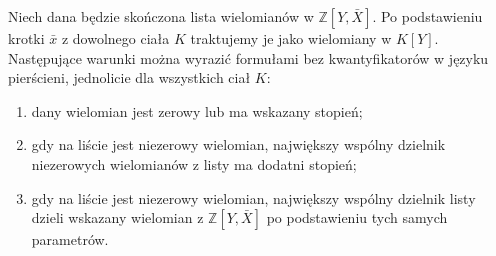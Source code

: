 \begin{lemat}
\label{lem:mod-qe-polynomial-branches}
Niech dana będzie skończona lista wielomianów
w $\mathbb Z[Y,\bar X]$. Po podstawieniu krotki
$\bar x$ z dowolnego ciała $K$ traktujemy je jako
wielomiany w $K[Y]$.
Następujące warunki można wyrazić formułami
bez kwantyfikatorów w języku pierścieni, jednolicie
dla wszystkich ciał $K$:
\begin{enumerate}
\item dany wielomian jest zerowy lub ma wskazany stopień;
\item gdy na liście jest niezerowy wielomian,
największy wspólny dzielnik niezerowych wielomianów
z listy ma dodatni stopień;
\item gdy na liście jest niezerowy wielomian,
największy wspólny dzielnik listy dzieli wskazany
wielomian z $\mathbb Z[Y,\bar X]$ po podstawieniu
tych samych parametrów.
\end{enumerate}
\end{lemat}

